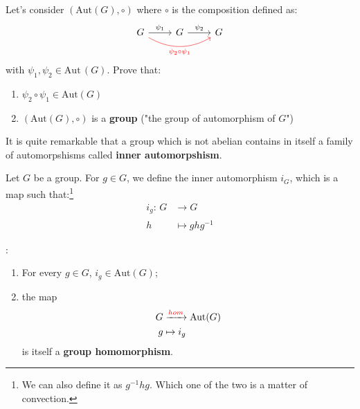 \documentclass[../main.tex]{subfiles}
\begin{document}
\begin{exercise}
Let's consider $(\text{Aut}(G),\circ)$ where $\circ$ is the composition defined as:
\[
\begin{tikzcd}
G\rar{\psi_1}\arrow[red, bend right]{rr}[red,swap,below]{\psi_2\circ\psi_1} & G\rar{\psi_2} & G
\end{tikzcd}
\]
with $\psi_1,\psi_2\in\text{Aut}\,(G)$. Prove that:
\begin{enumerate}
    \item $\psi_2\circ\psi_1\in\text{Aut}(G)$
    \item $(\text{Aut}(G),\circ)$ is a \textbf{group} ("the group of automorphism of $G$")
\end{enumerate}
\end{exercise}
It is quite remarkable that a group which is not abelian contains in itself a family of automorpshisms called \textbf{inner automorpshism}.
\begin{definition}
Let $G$ be a group. For $g\in G$, we define the inner automorphism $i_G$, which is a map such that:\footnote{We can also define it as $g^{-1}h g$. Which one of the two is a matter of convection.}
\begin{align*}
    i_g:\, G & \xrightarrow[]{}G\\
     h &\mapsto ghg^{-1}
\end{align*}
\end{definition}
\begin{lemma}:
\begin{enumerate}
    \item For every $g\in G$, {\color{red}$i_g\in\text{Aut}(G)$};
    \item the map
\begin{align*}
    G & \xrightarrow[]{{\color{red}hom}}\text{Aut}(G)\\
    g & \mapsto i_g
\end{align*} is itself a \textbf{group homomorphism}.
\end{enumerate}
\end{lemma}
\end{document}

